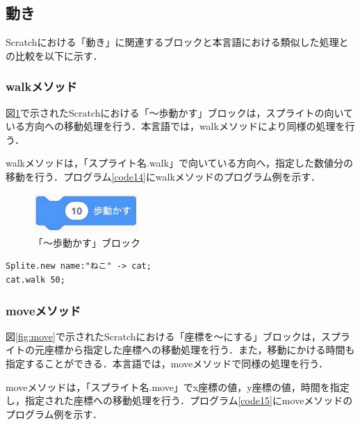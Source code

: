 \documentclass[10pt,a4j]{ltjsarticle}
\begin{document}
\subsection{動き}
Scratchにおける「動き」に関連するブロックと本言語における類似した処理との比較を以下に示す．
\subsubsection{walkメソッド}
図\ref{fig:walk}で示されたScratchにおける「〜歩動かす」ブロックは，スプライトの向いている方向への移動処理を行う．本言語では，walkメソッドにより同様の処理を行う．

walkメソッドは，「スプライト名.walk」で向いている方向へ，指定した数値分の移動を行う．プログラム\ref{code14}にwalkメソッドのプログラム例を示す．

\begin{figure}[H]
  \centering
  \includegraphics[height=15mm]{images/walk.pdf}
  \caption{「〜歩動かす」ブロック}
  \label{fig:walk}
\end{figure}

\begin{lstlisting}[caption=walkメソッドのプログラム例, label=code14]
Splite.new name:"ねこ" -> cat;
cat.walk 50; 
\end{lstlisting}

\subsubsection{moveメソッド}

図\ref{fig:move}で示されたScratchにおける「座標を〜にする」ブロックは，スプライトの元座標から指定した座標への移動処理を行う．また，移動にかける時間も指定することができる．本言語では，moveメソッドで同様の処理を行う．

moveメソッドは，「スプライト名.move」でx座標の値，y座標の値，時間を指定し，指定された座標への移動処理を行う．プログラム\ref{code15}にmoveメソッドのプログラム例を示す．
\end{document}
